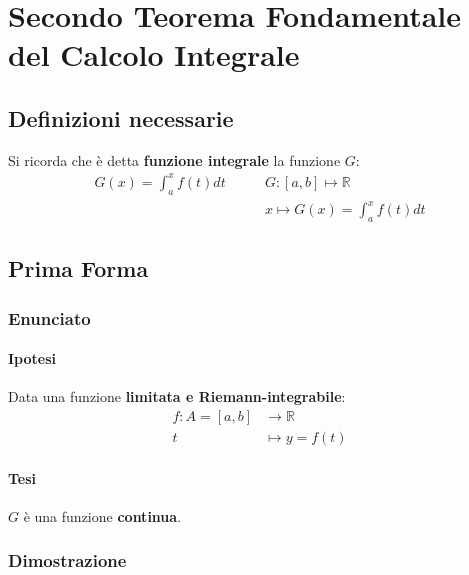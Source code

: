 \documentclass[../dimostrazioni]{subfiles}
\begin{document}
    \chapter{Secondo Teorema Fondamentale del Calcolo Integrale}
    \label{teoFondCalcoloIntegrale2}

        \section*{Definizioni necessarie}

            Si ricorda che è detta \textbf{funzione integrale} la funzione \(G\):
            \begin{align*}
                G(x) = \int_{a}^{x} f(t) dt \qquad   &{G : [a, b] \longmapsto \mathbb{R}} \\
                &{x \longmapsto G(x) = \int_{a}^{x} f(t) dt}
            \end{align*}

        \section*{Prima Forma}

            \subsection*{Enunciato}

                \subsubsection*{Ipotesi}
        
                    Data una funzione \textbf{limitata e Riemann-integrabile}:
                        \begin{align*}
                            f : A = [a, b] &\longrightarrow \mathbb{R}\\
                            t &\longmapsto y = f(t) 
                        \end{align*}

                \subsubsection*{Tesi}

                    \(G\) è una funzione \textbf{continua}.
            
            \subsection*{Dimostrazione}
\end{document}
